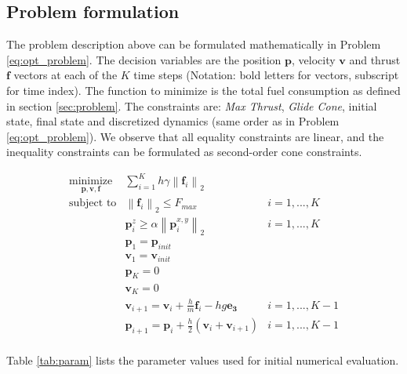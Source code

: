 \documentclass[12pt, letterpaper]{article}
\newcommand{\norm}[1]{\left\lVert#1\right\rVert}
\begin{document}
\subsection{Problem formulation}

The problem description above can be formulated mathematically in Problem \ref{eq:opt_problem}.
The decision variables are the position $\mathbf{p}$, velocity $\mathbf{v}$ and thrust $\mathbf{f}$ vectors at each of the $K$ time steps (Notation: bold letters for vectors, subscript for time index).
The function to minimize is the total fuel consumption as defined in section \ref{sec:problem}.
The constraints are: \textit{Max Thrust}, \textit{Glide Cone}, initial state, final state and discretized dynamics (same order as in Problem \ref{eq:opt_problem}).
We observe that all equality constraints are linear, and the inequality constraints can be formulated as second-order cone constraints.

\begin{equation}
\label{eq:opt_problem}
\begin{array}{lll}
  \underset{\mathbf{p,v,f}}{\mbox{minimize}} & \sum^{K}_{i=1} h \gamma \norm{\mathbf{f}_i}_2 & \\
  \mbox{subject to}
    & \norm{\mathbf{f}_i}_2 \leq F_{max} & i = 1,...,K \\
    & \mathbf{p}^z_i \geq \alpha \norm{\mathbf{p}^{x,y}_i}_2 & i = 1,...,K \\
    & \mathbf{p}_1 = \mathbf{p}_{init} & \\
    & \mathbf{v}_1 = \mathbf{v}_{init} & \\
    & \mathbf{p}_K = 0 & \\
    & \mathbf{v}_K = 0 & \\
    & \mathbf{v}_{i+1} = \mathbf{v}_i + \frac{h}{m} \mathbf{f}_i - hg\mathbf{e_3} & i = 1,...,K-1 \\
    & \mathbf{p}_{i+1} = \mathbf{p}_i + \frac{h}{2} (\mathbf{v}_i + \mathbf{v}_{i+1}) & i = 1,...,K-1 \\
\end{array}
\end{equation}


Table \ref{tab:param} lists the parameter values used for initial numerical evaluation.
\end{document}
